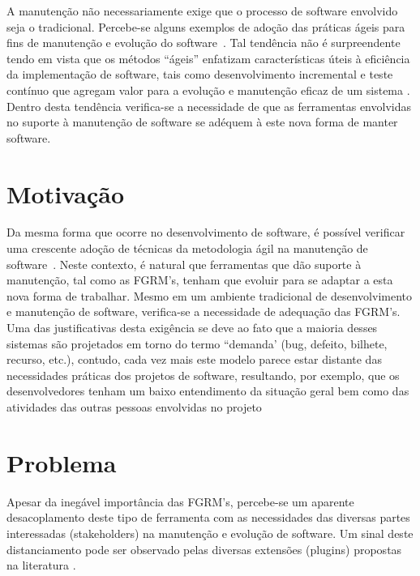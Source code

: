 A manutenção não necessariamente exige que o processo de software envolvido
seja o tradicional. Percebe-se alguns exemplos de adoção das práticas ágeis
para fins de manutenção e evolução do software~\cite{kajko2009model, Heeager2015, Devulapally2015,Naz2016}. Tal
tendência não é surpreendente tendo em vista que os métodos ``ágeis'' enfatizam
características úteis à eficiência da implementação de software, tais como desenvolvimento incremental e teste contínuo que agregam valor para a evolução e manutenção eficaz de um sistema
\cite{thomas2006agile}. Dentro desta tendência verifica-se a necessidade de que as ferramentas envolvidas no suporte à manutenção de software se adéquem à este nova forma de manter software. 

\section{Motivação}
\label{sec:intro-motivacao}



Da mesma forma que ocorre no desenvolvimento de software, é possível verificar uma crescente adoção
de técnicas da metodologia ágil na manutenção de software~\cite{Soltan2016,Devulapally2015,
	Heeager2015}. Neste contexto, é natural que ferramentas que dão suporte à manutenção, tal como
as FGRM's, tenham que evoluir para se adaptar a esta nova forma de trabalhar. Mesmo em um ambiente
tradicional de  desenvolvimento e manutenção de software, verifica-se a necessidade de adequação das
FGRM's. Uma das justificativas desta exigência se deve ao fato que a maioria desses sistemas são
projetados em torno do termo ``demanda' (bug, defeito, bilhete, recurso, etc.), contudo, cada vez
mais este modelo parece estar distante das necessidades práticas dos projetos de software,
resultando, por exemplo, que os desenvolvedores tenham um
baixo entendimento da situação geral bem como das atividades das outras pessoas envolvidas no
projeto~\cite{Baysal:2013:SAP:2486788.2486957}


\section{Problema}
\label{sec:intro-problema}

Apesar da inegável importância das FGRM's, percebe-se um aparente desacoplamento deste tipo de
ferramenta com as necessidades das diversas partes interessadas (stakeholders) na manutenção e
evolução de software. Um sinal deste distanciamento pode ser observado pelas diversas extensões
(plugins) propostas na literatura
\cite{101186,Thung:2014:BIT:2635868.2661678,Kononenko:2014:DED:2591062.2591075}.
 
